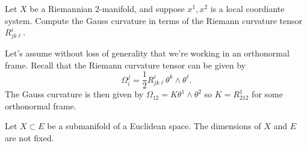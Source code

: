 \documentclass{../../templates/lkx_pset}
\begin{document}
\begin{problem}{4}
  Let $X$ be a Riemannian $2$-manifold, and suppose $x^1, x^2$ is a local coordiante system. Compute the Gauss curvature in terms of the Riemann curvature tensor $R^i_{jk\ell}$.
\end{problem}

\begin{solution}
  Let's assume without loss of generality that we're working in an orthonormal frame. Recall that the Riemann curvature tensor can be given by
  \[
    \Omega^j_i = \frac{1}{2} R^i_{j k \ell} \theta^k\wedge \theta^\ell.
  \]
  The Gauss curvature is then given by $\Omega_{12} = K\theta^1\wedge \theta^2$ so $K = R^{1}_{212}$ for some orthonormal frame.
\end{solution}

\begin{problem}{6}
  Let $X\subset E$ be a submanifold of a Euclidean space. The dimensions of $X$ and $E$ are not fixed.
\end{problem}
\end{document}
